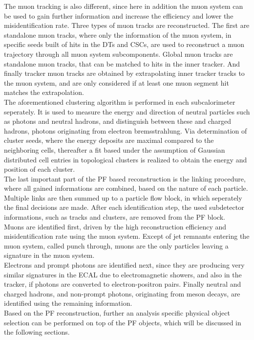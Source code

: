 The muon tracking is also different, since here in addition the muon system can be used to gain further information and increase the efficiency and lower the misidentification rate. Three types of muon tracks are reconstructed. The first are standalone muon tracks, where only the information of the muon system, in specific seeds built of hits in the DTs and CSCs, are used to reconstruct a muon trajectory through all muon system subcomponents. Global muon tracks are standalone muon tracks, that can be matched to hits in the inner tracker. And finally tracker muon tracks are obtained by extrapolating inner tracker tracks to the muon system, and are only considered if at least one muon segment hit matches the extrapolation.\\
The aforementioned clustering algorithm is performed in each subcalorimeter seperately. It is used to measure the energy and direction of neutral particles such as photons and neutral hadrons, and distinguish between these and charged hadrons, photons originating from electron bremsstrahlung. Via determination of cluster seeds, where the energy deposits are maximal compared to the neighboring cells, thereafter a fit based under the assumption of Gaussian distributed cell entries in topological clusters is realized to obtain the energy and position of each cluster.\\
The last important part of the PF based reconstruction is the linking procedure, where all gained informations are combined, based on the nature of each particle. Multiple links are then summed up to a particle flow block, in which seperately the final decisions are made. After each identification step, the used subdetector informations, such as tracks and clusters, are removed from the PF block.\\
Muons are identified first, driven by the high reconstruction efficiency and misidentification rate using the muon system. Except of jet remnants entering the muon system, called punch through, muons are the only particles leaving a signature in the muon system.\\
Electrons and prompt photons are identified next, since they are producing very similar signatures in the ECAL due to electromagnetic showers, and also in the tracker, if photons are converted to electron-positron pairs. Finally neutral and charged hadrons, and non-prompt photons, \eg originating from meson decays, are identified using the remaining information.\\
Based on the PF reconstruction, further an analysis specific physical object selection can be performed on top of the PF objects, which will be discussed in the following sections.
















